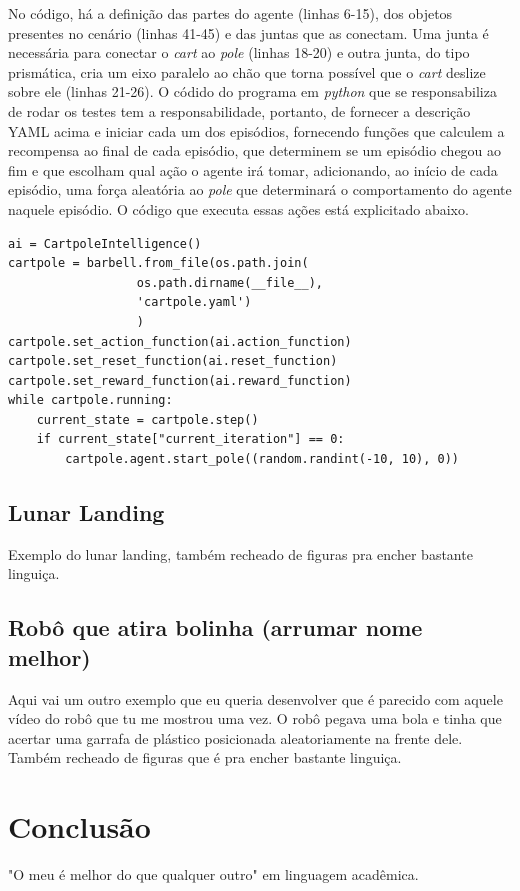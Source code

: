 \documentclass[cic,tc]{iiufrgs}
\begin{document}
No código, há a definição das partes do agente (linhas 6-15), dos objetos presentes no cenário (linhas 41-45) e das
juntas que as conectam. Uma junta é necessária para conectar o \textit{cart} ao \textit{pole} (linhas 18-20) e outra
junta, do tipo prismática, cria um eixo paralelo ao chão que torna possível que o \textit{cart} deslize sobre ele
(linhas 21-26). O códido do programa em \textit{python} que se responsabiliza de rodar os testes tem a responsabilidade,
portanto, de fornecer a descrição YAML acima e iniciar cada um dos episódios, fornecendo funções que calculem
a recompensa ao final de cada episódio, que determinem se um episódio chegou ao fim e que escolham qual ação o agente irá
tomar, adicionando, ao início de cada episódio, uma força aleatória ao \textit{pole} que determinará o
comportamento do agente naquele episódio. O código que executa essas ações está explicitado abaixo.


\begin{verbatim}
ai = CartpoleIntelligence()
cartpole = barbell.from_file(os.path.join(
                  os.path.dirname(__file__),
                  'cartpole.yaml')
                  )
cartpole.set_action_function(ai.action_function)
cartpole.set_reset_function(ai.reset_function)
cartpole.set_reward_function(ai.reward_function)
while cartpole.running:
    current_state = cartpole.step()
    if current_state["current_iteration"] == 0:
        cartpole.agent.start_pole((random.randint(-10, 10), 0))
\end{verbatim}

\section{Lunar Landing}
Exemplo do lunar landing, também recheado de figuras pra encher bastante linguiça.
\section{Robô que atira bolinha (arrumar nome melhor)}
Aqui vai um outro exemplo que eu queria desenvolver que é parecido com aquele vídeo do robô que tu me mostrou uma vez.
O robô pegava uma bola e tinha que acertar uma garrafa de plástico posicionada aleatoriamente na frente dele.
Também recheado de figuras que é pra encher bastante linguiça.



\chapter{Conclusão}
"O meu é melhor do que qualquer outro" em linguagem acadêmica.

%



\end{document}
